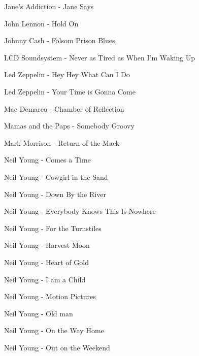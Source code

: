 Jane's Addiction - Jane Says \dotfill \pageref{Jane Says - Jane's Addiction} 

John Lennon - Hold On \dotfill \pageref{Hold On - John Lennon} 

Johnny Cash - Folsom Prison Blues \dotfill \pageref{Folsom Prison Blues - Johnny Cash} 

LCD Soundsystem - Never as Tired as When I'm Waking Up \dotfill \pageref{Never as Tired as When I'm Waking Up - LCD Soundsystem} 

Led Zeppelin - Hey Hey What Can I Do \dotfill \pageref{Hey Hey What Can I Do - Led Zeppelin} 

Led Zeppelin - Your Time is Gonna Come \dotfill \pageref{Your Time is Gonna Come - Led Zeppelin} 

Mac Demarco - Chamber of Reflection \dotfill \pageref{Chamber of Reflection - Mac Demarco} 

Mamas and the Paps - Somebody Groovy \dotfill \pageref{Somebody Groovy - Mamas and the Paps} 

Mark Morrison - Return of the Mack \dotfill \pageref{Return of the Mack - Mark Morrison} 

Neil Young - Comes a Time \dotfill \pageref{Comes a Time - Neil Young} 

Neil Young - Cowgirl in the Sand \dotfill \pageref{Cowgirl in the Sand - Neil Young} 

Neil Young - Down By the River \dotfill \pageref{Down By the River - Neil Young} 

Neil Young - Everybody Knows This Is Nowhere \dotfill \pageref{Everybody Knows This Is Nowhere - Neil Young} 

Neil Young - For the Turnstiles \dotfill \pageref{For the Turnstiles - Neil Young} 

Neil Young - Harvest Moon \dotfill \pageref{Harvest Moon - Neil Young} 

Neil Young - Heart of Gold \dotfill \pageref{Heart of Gold - Neil Young} 

Neil Young - I am a Child \dotfill \pageref{I am a Child - Neil Young} 

Neil Young - Motion Pictures \dotfill \pageref{Motion Pictures - Neil Young} 

Neil Young - Old man \dotfill \pageref{Old man - Neil Young} 

Neil Young - On the Way Home \dotfill \pageref{On the Way Home - Neil Young} 

Neil Young - Out on the Weekend \dotfill \pageref{Out on the Weekend - Neil Young} 

